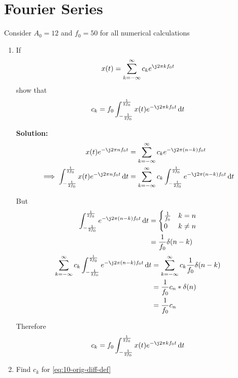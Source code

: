 \documentclass[journal,12pt,twocolumn]{IEEEtran}
\newcommand{\solution}{\noindent \textbf{Solution: }}
\providecommand{\der}[1]{\mathrm{d} #1}
\numberwithin{equation}{section}
\numberwithin{figure}{section}
\renewcommand\thesection{\arabic{section}}
\begin{document}
	\section{Fourier Series}
	Consider $A_0 =12$ and $f_0 = 50$ for all numerical calculations
	\begin{enumerate}[label=\thesection.\arabic*,ref=\thesection.\theenumi]
	\item If
	\begin{align}
		x(t) = \sum_{k = -\infty}^{\infty}c_ke^{\j2\pi kf_0 t}
		\label{eq:one-Z-complex}
	\end{align}
	show that 
	\begin{align}
		c_k = f_0\int_{-\frac{1}{2f_0}}^{\frac{1}{2f_0}}x(t)e^{-\j2\pi kf_0 t}\, \der{t}
		\label{eq:one-Z}
	\end{align}
	
	\solution
	\begin{align}
    		x(t)e^{-\j2\pi nf_0t} &= \sum_{k = -\infty}^{\infty}c_ke^{-\j2\pi (n - k)f_0 t} \\
    		\implies \int_{-\frac{1}{2f_0}}^{\frac{1}{2f_0}} x(t)e^{-\j2\pi nf_0t} \,\der{t} &= \sum_{k = -\infty}^{\infty} c_k \int_{-\frac{1}{2f_0}}^{\frac{1}{2f_0}} e^{-\j2\pi (n - k)f_0 t} \,\der{t} 
	\end{align}
	
	But 
	\begin{align}
		\int_{-\frac{1}{2f_0}}^{\frac{1}{2f_0}} e^{-\j2\pi (n - k)f_0 t} \,\der{t} &=
		\begin{cases}
			\frac{1}{f_0} & k = n \\
			0 & k \ne n	
		\end{cases}	\\
		&= \frac{1}{f_0} \delta(n-k)
	\end{align}
	\begin{align}
		\sum_{k = -\infty}^{\infty} c_k \int_{-\frac{1}{2f_0}}^{\frac{1}{2f_0}} e^{-\j2\pi (n - k)f_0 t} \,\der{t} &= \sum_{k = -\infty}^{\infty} c_k \frac{1}{f_0} \delta(n-k) \\
		&= \frac{1}{f_0} c_n * \delta(n) \\
		&= \frac{1}{f_0} c_n
	\end{align}
	
	Therefore
	\begin{align}
		c_k = f_0\int_{-\frac{1}{2f_0}}^{\frac{1}{2f_0}}x(t)e^{-\j2\pi kf_0 t}\, \der{t}
	\end{align}
	
	\item Find $c_k$ for \eqref{eq:10-orig-diff-def}
	

\end{enumerate}
\end{document}
